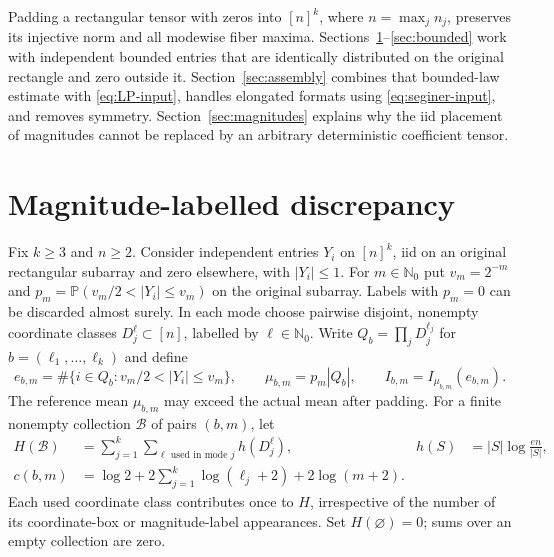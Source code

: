 \documentclass[11pt]{article}
\theoremstyle{spaced}
\theoremstyle{remark}
\numberwithin{equation}{section}
\newcommand{\Pp}{\mathbb P}
\newcommand{\NN}{\mathbb N_0}
\begin{document}
Padding a rectangular tensor with zeros into $[n]^k$, where
$n=\max_jn_j$, preserves its injective norm and all modewise fiber
maxima. Sections~\ref{sec:discrepancy}--\ref{sec:bounded} work with
independent bounded entries that are identically distributed on the
original rectangle and zero outside it. Section~\ref{sec:assembly}
combines that bounded-law estimate with \eqref{eq:LP-input}, handles
elongated formats using \eqref{eq:seginer-input}, and removes symmetry.
Section~\ref{sec:magnitudes} explains why the iid placement of magnitudes
cannot be replaced by an arbitrary deterministic coefficient tensor.

\section{Magnitude-labelled discrepancy}\label{sec:discrepancy}

Fix $k\ge3$ and $n\ge2$. Consider independent entries $Y_i$ on $[n]^k$, iid on an original
rectangular subarray and zero elsewhere, with $|Y_i|\le1$.
For $m\in\NN$ put $v_m=2^{-m}$ and
$p_m=\Pp(v_m/2<|Y_i|\le v_m)$ on the original subarray.
Labels with $p_m=0$ can be discarded almost surely. In each mode choose
pairwise disjoint, nonempty coordinate classes $D_j^\ell\subset[n]$,
labelled by $\ell\in\NN$. Write
$Q_b=\prod_jD_j^{\ell_j}$ for $b=(\ell_1,\ldots,\ell_k)$ and define
\[
 e_{b,m}=\#\{i\in Q_b:v_m/2<|Y_i|\le v_m\},\qquad
 \mu_{b,m}=p_m|Q_b|,\qquad I_{b,m}=I_{\mu_{b,m}}(e_{b,m}).
\]
The reference mean $\mu_{b,m}$ may exceed the actual mean after padding.
For a finite nonempty collection $\mathcal B$ of pairs $(b,m)$, let
\begin{align*}
 H(\mathcal B)&=\sum_{j=1}^k\sum_{\ell\text{ used in mode }j}h(D_j^\ell),
 &h(S)&=|S|\log\frac{en}{|S|},\\
 c(b,m)&=\log2+2\sum_{j=1}^k\log(\ell_j+2)+2\log(m+2).
\end{align*}
Each used coordinate class contributes once to $H$, irrespective of the
number of its coordinate-box or magnitude-label appearances. Set
$H(\varnothing)=0$; sums over an empty collection are zero.
\end{document}
